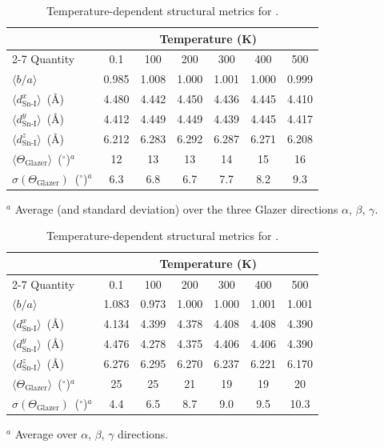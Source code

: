 \begin{table}[htbp]
  \centering
  \caption{Temperature-dependent structural metrics for \FASnI{}.}
  \label{tab:fasni_struct}
  \begin{tabular}{lcccccc}
    \toprule
    & \multicolumn{6}{c}{Temperature (K)} \\
    \cmidrule(lr){2-7}
    Quantity & 0.1 & 100 & 200 & 300 & 400 & 500 \\
    \midrule
    $\langle b/a \rangle$
      & 0.985 & 1.008 & 1.000 & 1.001 & 1.000 & 0.999 \\
    $\langle d_{\text{Sn-I}}^{x}\rangle$~(\AA)
      & 4.480 & 4.442 & 4.450 & 4.436 & 4.445 & 4.410 \\
    $\langle d_{\text{Sn-I}}^{y}\rangle$~(\AA)
      & 4.412 & 4.449 & 4.449 & 4.439 & 4.445 & 4.417 \\
    $\langle d_{\text{Sn-I}}^{z}\rangle$~(\AA)
      & 6.212 & 6.283 & 6.292 & 6.287 & 6.271 & 6.208 \\
    $\langle \Theta_{\text{Glazer}}\rangle$~($^{\circ}$)$^{a}$
      & 12 & 13 & 13 & 14 & 15 & 16 \\
    $\sigma(\Theta_{\text{Glazer}})$~($^{\circ}$)$^{a}$
      & 6.3 & 6.8 & 6.7 & 7.7 & 8.2 & 9.3 \\
    \bottomrule
  \end{tabular}
  \begin{flushleft}
    \small $^{a}$ Average (and standard deviation) over the three
    Glazer directions $\alpha$, $\beta$, $\gamma$.
  \end{flushleft}
\end{table}

\begin{table}[htbp]
  \centering
  \caption{Temperature-dependent structural metrics for \MASnI{}.}
  \label{tab:masni_struct}
  \begin{tabular}{lcccccc}
    \toprule
    & \multicolumn{6}{c}{Temperature (K)} \\
    \cmidrule(lr){2-7}
    Quantity & 0.1 & 100 & 200 & 300 & 400 & 500 \\
    \midrule
    $\langle b/a \rangle$
      & 1.083 & 0.973 & 1.000 & 1.000 & 1.001 & 1.001 \\
    $\langle d_{\text{Sn-I}}^{x}\rangle$~(\AA)
      & 4.134 & 4.399 & 4.378 & 4.408 & 4.408 & 4.390 \\
    $\langle d_{\text{Sn-I}}^{y}\rangle$~(\AA)
      & 4.476 & 4.278 & 4.375 & 4.406 & 4.406 & 4.390 \\
    $\langle d_{\text{Sn-I}}^{z}\rangle$~(\AA)
      & 6.276 & 6.295 & 6.270 & 6.237 & 6.221 & 6.170 \\
    $\langle \Theta_{\text{Glazer}}\rangle$~($^{\circ}$)$^{a}$
      & 25 & 25 & 21 & 19 & 19 & 20 \\
    $\sigma(\Theta_{\text{Glazer}})$~($^{\circ}$)$^{a}$
      & 4.4 & 6.5 & 8.7 & 9.0 & 9.5 & 10.3 \\
    \bottomrule
  \end{tabular}
  \begin{flushleft}
    \small $^{a}$ Average over $\alpha$, $\beta$, $\gamma$ directions.
  \end{flushleft}
\end{table}

